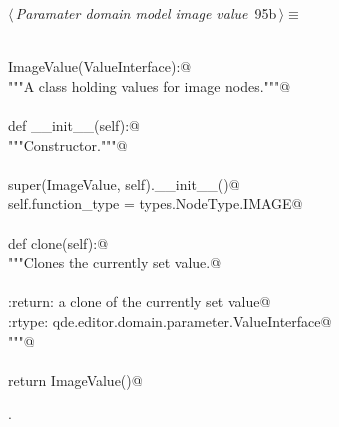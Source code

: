\documentclass[
    a4paper,      %
    10pt,         %
    openright,    %
    notitlepage,  %
    parskip=half, %
]{scrreprt}       %
\theoremstyle{definition}                    %
\begin{document}
\begin{flushleft} \small
\begin{minipage}{\linewidth}\label{scrap152}\raggedright\small
{} $\langle\,${\itshape Paramater domain model image value}\nobreak\ {\footnotesize {95b}}$\,\rangle\equiv$
\vspace{-1exm}
\begin{list}{}{} \item
\mbox{}\lstinline@@\\
\mbox{}\lstinline@class ImageValue(ValueInterface):@\\
\mbox{}\lstinline@    """A class holding values for image nodes."""@\\
\mbox{}\lstinline@@\\
\mbox{}\lstinline@    def __init__(self):@\\
\mbox{}\lstinline@        """Constructor."""@\\
\mbox{}\lstinline@@\\
\mbox{}\lstinline@        super(ImageValue, self).__init__()@\\
\mbox{}\lstinline@        self.function_type = types.NodeType.IMAGE@\\
\mbox{}\lstinline@@\\
\mbox{}\lstinline@    def clone(self):@\\
\mbox{}\lstinline@        """Clones the currently set value.@\\
\mbox{}\lstinline@@\\
\mbox{}\lstinline@        :return: a clone of the currently set value@\\
\mbox{}\lstinline@        :rtype:  qde.editor.domain.parameter.ValueInterface@\\
\mbox{}\lstinline@        """@\\
\mbox{}\lstinline@@\\
\mbox{}\lstinline@        return ImageValue()@{\NWsep}
\end{list}
\vspace{-1.5ex}
\footnotesize
\begin{list}{}{\setlength{\itemsep}{-\parsep}\setlength{\itemindent}{-\leftmargin}}
\item {\NWtxtMacroNoRef}.

\item{}
\end{list}
\end{minipage}\vspace{4ex}
\end{flushleft}
\end{document}
